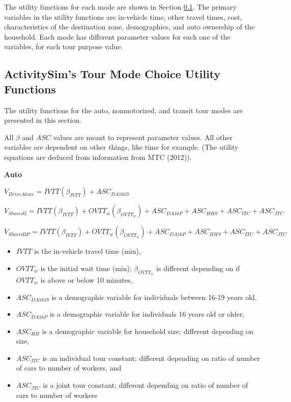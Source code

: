 \documentclass[12pt, oneside, openright]{byuthesis}
\providecommand{\tightlist}{%
  \setlength{\itemsep}{0pt}\setlength{\parskip}{0pt}}
\begin{document}
The utility functions for each mode are shown in Section \ref{lit411}. The primary variables in the utility functions are in-vehicle time, other travel times, cost, characteristics of the destination zone, demographics, and auto ownership of the household. Each mode has different parameter values for each one of the variables, for each tour purpose value.

\hypertarget{lit411}{%
\subsection{ActivitySim's Tour Mode Choice Utility Functions}\label{lit411}}

The utility functions for the auto, nonmotorized, and transit tour modes are presented in this section.

All \(\beta\) and \(ASC\) values are meant to represent parameter values. All other variables are dependent on other things, like time for example. (The utility equations are deduced from information from MTC (2012)).

\textbf{Auto}

\(V_{DriveAlone} = IVTT(\beta_{IVTT}) + ASC_{DA1619}\)

\(V_{Shared2} = IVTT(\beta_{IVTT}) + OVTT_w(\beta_{OVTT_w}) + ASC_{DA16P} + ASC_{HHS} + ASC_{ITC} + ASC_{JTC}\)

\(V_{Shared3P} = IVTT(\beta_{IVTT}) + OVTT_w(\beta_{OVTT_w}) + ASC_{DA16P} + ASC_{HHS} + ASC_{ITC} + ASC_{JTC}\)

\begin{itemize}
\tightlist
\item
  \(IVTT\) is the in-vehicle travel time (min),
\item
  \(OVTT_w\) is the initial wait time (min); \(\beta_{OVTT_w}\) is different depending on if \(OVTT_w\) is above or below 10 minutes,
\item
  \(ASC_{DA1619}\) is a demographic variable for individuals between 16-19 years old,
\item
  \(ASC_{DA16P}\) is a demographic variable for individuals 16 years old or older,
\item
  \(ASC_{HH}\) is a demographic variable for household size; different depending on size,
\item
  \(ASC_{ITC}\) is an individual tour constant; different depending on ratio of number of cars to number of workers, and
\item
  \(ASC_{JTC}\) is a joint tour constant; different depending on ratio of number of cars to number of workers
\end{itemize}
\end{document}

